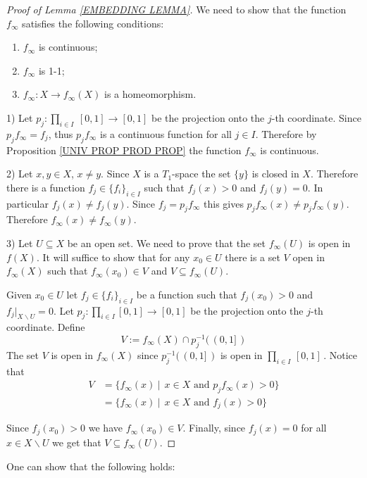 \documentclass[11pt, letterpaper, oneside]{report}
\theoremstyle{pplain}
\newtheorem{ITERMVALUE THM}[theorem]{Intermediate Value Theorem}
\newtheorem{HEINEBOREL THM}[theorem]{Heine-Borel Theorem}
\newtheorem{UMETR THM}[theorem]{Urysohn Metrization Theorem}
\newtheorem{UMETR2 THM}[theorem]{Urysohn Metrization Theorem (v.2)}
\theoremstyle{ddefinition}
\theoremstyle{nnn}
\newtheorem{TDA NN}[theorem]{Topological Data Analysis. }
\theoremstyle{eexercise}
\newcommand{\ssmin}{\smallsetminus}
\newcommand{\benu}{\begin{enumerate}}
\newcommand{\eenu}{\end{enumerate}}
\begin{document}
\begin{proof}[Proof of Lemma \ref{EMBEDDING LEMMA}]
We need to show that the function $f_{\infty}$ satisfies the following conditions:
\benu
\item $f_{\infty}$ is continuous;
\item $f_{\infty}$ is 1-1;
\item $f_{\infty}\colon X \to f_{\infty}(X)$ is a homeomorphism. 
\eenu

1) Let $p_{j}\colon \prod_{i\in I} \ [0, 1] \to [0, 1]$ be the projection onto the $j$-th coordinate. 
Since $p_{j}f_{\infty} = f_{j}$, thus $p_{j}f_{\infty}$ is a continuous function for all $j\in I$. 
Therefore by Proposition \ref{UNIV PROP PROD PROP} the function $f_{\infty}$ is continuous.   

2) Let $x, y\in X$, $x\neq y$. Since $X$ is a $T_{1}$-space the set $\{y\}$ is 
closed in $X$. Therefore there is a function $f_{j}\in \{f_{i}\}_{i\in I}$
such that $f_{j}(x) > 0$ and $f_{j}(y) = 0$. In particular $f_{j}(x) \neq f_{j}(y)$.  
Since $f_{j} = p_{j}f_{\infty}$ this gives 
$p_{j}f_{\infty}(x) \neq p_{j}f_{\infty}(y)$. Therefore $f_{\infty}(x)\neq f_{\infty}(y)$.

3) Let  $U\subseteq X$ be an open set. We need to prove that the set $f_{\infty}(U)$ is  open 
in $f(X)$.  It will suffice to show that for any  $x_{0}\in U$ there is a set $V$ open in $f_{\infty}(X)$
such that  $f_{\infty}(x_{0})\in V$  and $V\subseteq f_{\infty}(U)$.

Given $x_{0}\in U$ let $f_{j}\in \{f_{i}\}_{i\in I}$ be a function such that $f_{j}(x_{0}) > 0$
and $f_{j}|_{X\ssmin U} = 0$.   
Let $p_{j}\colon \prod_{i\in I} [0, 1] \to [0, 1]$ be the projection onto the $j$-th coordinate. 
Define 
$$V:= f_{\infty}(X)\cap p_{j}^{-1}(\, (0, 1]\, )$$ 
The set $V$ is open in $f_{\infty}(X)$ since $ p_{j}^{-1}(\, (0, 1]\, )$ is open in $ \prod_{i\in I} \, [0, 1]\, $.
Notice that 
\begin{align*}
V & = \{f_{\infty}(x) \ | \ \ x\in X \text{ and } p_{j}f_{\infty}(x) > 0  \}  \\
& = \{f_{\infty}(x) \ | \ \ x\in X \text{ and } f_{j}(x) > 0  \} 
\end{align*}

Since $f_{j}(x_{0}) >0$ we have $f_{\infty}(x_{0}) \in V$. Finally, since $f_{j}(x) = 0$  for all $x\in X \ssmin U$
we get that $V\subseteq f_{\infty}(U)$.
\end{proof} 



One can show that the following holds: 
\end{document}
